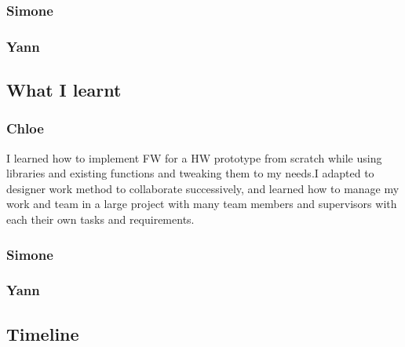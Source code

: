     \subsubsection{Simone}
    \subsubsection{Yann}
 
\subsection{What I learnt}
    \subsubsection{Chloe} 
I learned how to implement FW for a HW prototype from scratch while using libraries and existing functions and tweaking them to my needs.I adapted to designer work method to collaborate successively, and learned how to manage my work and team in a large project with many team members and supervisors with each their own tasks and requirements. 
    \subsubsection{Simone}
    \subsubsection{Yann}
    
\subsection{Timeline}


